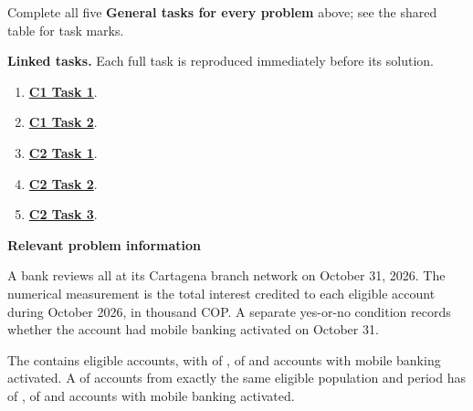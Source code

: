 Complete all five \textbf{General tasks for every problem} above; see the shared table for task marks.

\textbf{Linked tasks.} Each full task is reproduced immediately before its solution.

\begin{enumerate}[label=(\alph*),itemsep=6pt]
\item \hyperref[sol:p2c1a]{\textbf{C1 Task 1}}. \cOneA\ 
\item \hyperref[sol:p2c1b]{\textbf{C1 Task 2}}. \cOneB\ 
\item \hyperref[sol:p2c2a]{\textbf{C2 Task 1}}. \cTwoA\ 
\item \hyperref[sol:p2c2b]{\textbf{C2 Task 2}}. \cTwoB\ 
\item \hyperref[sol:p2c2c]{\textbf{C2 Task 3}}. \cTwoC\ 
\end{enumerate}
\secInicio[][sec:p2]

\clearpage



\textbf{Relevant problem information}

\begin{probleminfoexcerpt}
A bank reviews all      at its Cartagena branch network on October 31, 2026. The numerical measurement is the total interest credited to each eligible account during October 2026, in thousand COP. A separate yes-or-no condition records whether the account had mobile banking activated on October 31.
\end{probleminfoexcerpt}

\begin{probleminfoexcerpt}
The     contains  eligible accounts, with    of   ,    of    and  accounts with mobile banking activated. A     of  accounts from exactly the same eligible population and period has   of   ,    of    and  accounts with mobile banking activated.
\end{probleminfoexcerpt}

